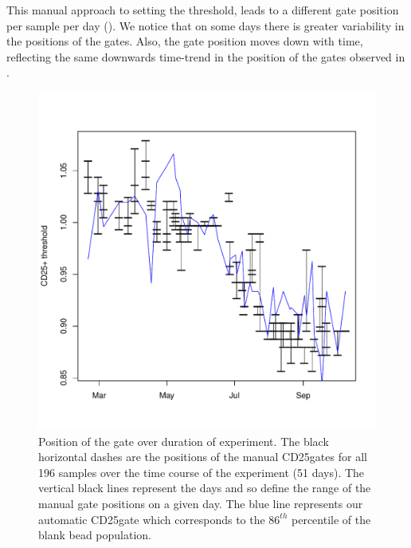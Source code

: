 


This manual approach to setting the threshold, leads to a different gate position per sample per day ().
We notice that on some days there is greater variability in the positions of the gates.
Also, the gate position moves down with time, reflecting the same downwards time-trend in the position of the gates observed in .

\begin{figure} [h]
\centering
\includegraphics[width=.5\textwidth] {figures/cd25pos-gates.pdf}
{Position of the \positive gate over duration of experiment.}
{
The black horizontal dashes are the positions of the manual CD25\positive gates for all 196 samples over the time course of the experiment (51 days).
The vertical black lines represent the days and so define the range of the manual gate positions on a given day.
The blue line represents our automatic CD25\positive gate which corresponds to the $86^{th}$ percentile of the blank bead population.
}
\end{figure}


